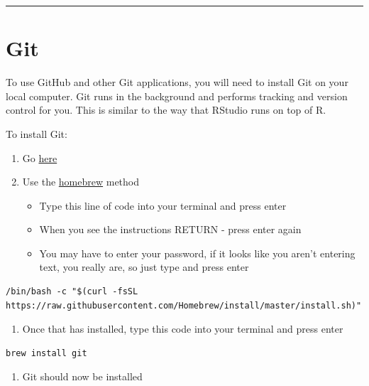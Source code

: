 \documentclass[]{book}
\providecommand{\tightlist}{%
  \setlength{\itemsep}{0pt}\setlength{\parskip}{0pt}}
\begin{document}
\begin{center}\rule{0.5\linewidth}{0.5pt}\end{center}

\hypertarget{git}{%
\section{Git}\label{git}}

To use GitHub and other Git applications, you will need to install Git on your local computer. Git runs in the background and performs tracking and version control for you. This is similar to the way that RStudio runs on top of R.

To install Git:

\begin{enumerate}
\def\labelenumi{\arabic{enumi}.}
\tightlist
\item
  Go \href{https://git-scm.com/downloads}{here}
\item
  Use the \href{https://brew.sh/}{homebrew} method

  \begin{itemize}
  \tightlist
  \item
    Type this line of code into your terminal and press enter
  \item
    When you see the instructions RETURN - press enter again
  \item
    You may have to enter your password, if it looks like you aren't entering text, you really are, so just type and press enter
  \end{itemize}
\end{enumerate}

\begin{verbatim}
/bin/bash -c "$(curl -fsSL https://raw.githubusercontent.com/Homebrew/install/master/install.sh)"
\end{verbatim}

\begin{enumerate}
\def\labelenumi{\arabic{enumi}.}
\setcounter{enumi}{2}
\tightlist
\item
  Once that has installed, type this code into your terminal and press enter
\end{enumerate}

\begin{verbatim}
brew install git
\end{verbatim}

\begin{enumerate}
\def\labelenumi{\arabic{enumi}.}
\setcounter{enumi}{3}
\tightlist
\item
  Git should now be installed
\end{enumerate}
\end{document}
